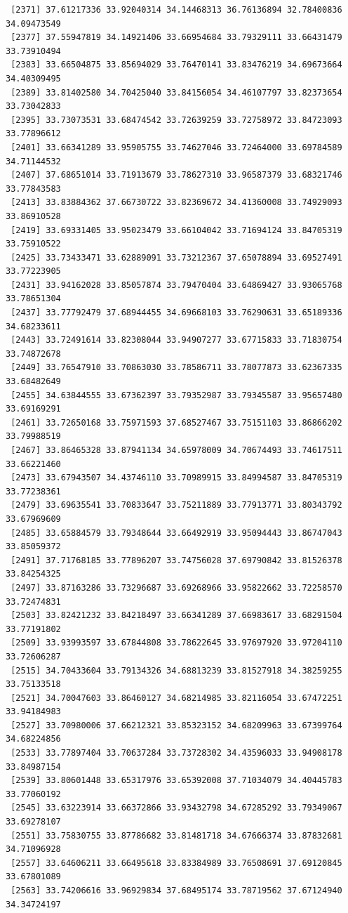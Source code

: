 \documentclass[
  letterpaper,
  DIV=11,
  numbers=noendperiod]{scrartcl}
\begin{document}
\begin{verbatim}
 [2371] 37.61217336 33.92040314 34.14468313 36.76136894 32.78400836 34.09473549
 [2377] 37.55947819 34.14921406 33.66954684 33.79329111 33.66431479 33.73910494
 [2383] 33.66504875 33.85694029 33.76470141 33.83476219 34.69673664 34.40309495
 [2389] 33.81402580 34.70425040 33.84156054 34.46107797 33.82373654 33.73042833
 [2395] 33.73073531 33.68474542 33.72639259 33.72758972 33.84723093 33.77896612
 [2401] 33.66341289 33.95905755 33.74627046 33.72464000 33.69784589 34.71144532
 [2407] 37.68651014 33.71913679 33.78627310 33.96587379 33.68321746 33.77843583
 [2413] 33.83884362 37.66730722 33.82369672 34.41360008 33.74929093 33.86910528
 [2419] 33.69331405 33.95023479 33.66104042 33.71694124 33.84705319 33.75910522
 [2425] 33.73433471 33.62889091 33.73212367 37.65078894 33.69527491 33.77223905
 [2431] 33.94162028 33.85057874 33.79470404 33.64869427 33.93065768 33.78651304
 [2437] 33.77792479 37.68944455 34.69668103 33.76290631 33.65189336 34.68233611
 [2443] 33.72491614 33.82308044 33.94907277 33.67715833 33.71830754 33.74872678
 [2449] 33.76547910 33.70863030 33.78586711 33.78077873 33.62367335 33.68482649
 [2455] 34.63844555 33.67362397 33.79352987 33.79345587 33.95657480 33.69169291
 [2461] 33.72650168 33.75971593 37.68527467 33.75151103 33.86866202 33.79988519
 [2467] 33.86465328 33.87941134 34.65978009 34.70674493 33.74617511 33.66221460
 [2473] 33.67943507 34.43746110 33.70989915 33.84994587 33.84705319 33.77238361
 [2479] 33.69635541 33.70833647 33.75211889 33.77913771 33.80343792 33.67969609
 [2485] 33.65884579 33.79348644 33.66492919 33.95094443 33.86747043 33.85059372
 [2491] 37.71768185 33.77896207 33.74756028 37.69790842 33.81526378 33.84254325
 [2497] 33.87163286 33.73296687 33.69268966 33.95822662 33.72258570 33.72474831
 [2503] 33.82421232 33.84218497 33.66341289 37.66983617 33.68291504 33.77191802
 [2509] 33.93993597 33.67844808 33.78622645 33.97697920 33.97204110 33.72606287
 [2515] 34.70433604 33.79134326 34.68813239 33.81527918 34.38259255 33.75133518
 [2521] 34.70047603 33.86460127 34.68214985 33.82116054 33.67472251 33.94184983
 [2527] 33.70980006 37.66212321 33.85323152 34.68209963 33.67399764 34.68224856
 [2533] 33.77897404 33.70637284 33.73728302 34.43596033 33.94908178 33.84987154
 [2539] 33.80601448 33.65317976 33.65392008 37.71034079 34.40445783 33.77060192
 [2545] 33.63223914 33.66372866 33.93432798 34.67285292 33.79349067 33.69278107
 [2551] 33.75830755 33.87786682 33.81481718 34.67666374 33.87832681 34.71096928
 [2557] 33.64606211 33.66495618 33.83384989 33.76508691 37.69120845 33.67801089
 [2563] 33.74206616 33.96929834 37.68495174 33.78719562 37.67124940 34.34724197

\end{verbatim}
\end{document}
